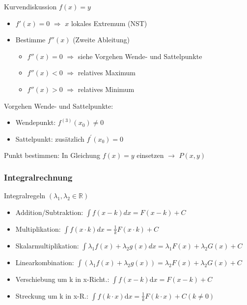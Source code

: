 \begin{KR}{Kurvendiskussion} $f(x) = y$
    \begin{itemize}
        \item $f'(x) = 0$ $ \Rightarrow$ $x$ lokales Extremum (NST)
        \item Bestimme $f''(x)$ (Zweite Ableitung)
		\begin{itemize}
			\item $f''(x) = 0$ $ \Rightarrow$ siehe Vorgehen Wende- und Sattelpunkte
			\item $f''(x) < 0$ $ \Rightarrow$ relatives Maximum
			\item $f''(x) > 0$ $ \Rightarrow$ relatives Minimum
		\end{itemize}
    \end{itemize}
    Vorgehen Wende- und Sattelpunkte:
    \begin{itemize}
        \item Wendepunkt: $f^{(3)}(x_{0}) \neq 0$ 
        \item Sattelpunkt: zusätzlich $f^{\prime}(x_{0})=0$ 
    \end{itemize}
    Punkt bestimmen: In Gleichung $f(x) = y$ einsetzen $\rightarrow$ $P(x, y)$
\end{KR}





\subsubsection{Integralrechnung}

\begin{concept}{Integralregeln} $(\lambda_1,\lambda_2 \in \mathbb{R} )$
    \begin{itemize}
      \item Addition/Subtraktion:
      $\int f(x-k) d x=F(x-k)+C$
      \item Multiplikation:
      $\int f(x \cdot k) d x=\frac{1}{k} F(x \cdot k)+C$
      \item Skalarmultiplikation:
      $\int \lambda_{1} f(x)+\lambda_{2} g(x) d x=\lambda_{1} F(x)+\lambda_{2} G(x)+C$
      \item Linearkombination: $\int{(\lambda_1f(x)+\lambda_2g(x))} = \lambda_2F(x)+\lambda_2G(x)+C$
      \item Verschiebung um k in x-Richt.: $\int{f(x-k)\mathrm{d}x}= F(x-k)+C$
      \item Streckung um k in x-R.: $\int{f(k\cdot x)\mathrm{d}x}= \frac{1}{k}F(k\cdot x)+C (k\neq0 )$
    \end{itemize}
\end{concept}


